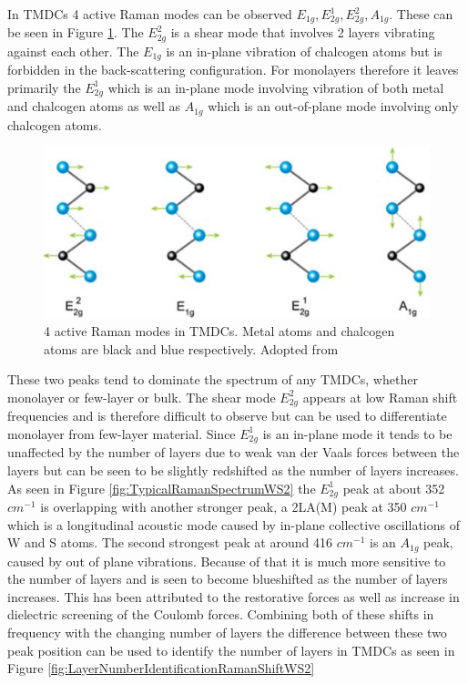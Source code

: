 	In TMDCs 4 active Raman modes can be observed $E_{1g}, E^1_{2g}, E^2_{2g}, A_{1g}$. These can be seen in Figure \ref{fig:4ActiveRamanModes}. The $E^2_{2g}$ is a shear mode that involves 2 layers vibrating against each other. The $E_{1g}$ is an in-plane vibration of chalcogen atoms but is forbidden in the back-scattering configuration. For monolayers therefore it leaves primarily the $E^1_{2g}$ which is an in-plane mode involving vibration of both metal and chalcogen atoms as well as $A_{1g}$ which is an out-of-plane mode involving only chalcogen atoms. 
	
\begin{figure}[h]
	\begin{center}
		\includegraphics[scale=0.4]{RamanActiveModes.png}
		\caption{4 active Raman modes in TMDCs. Metal atoms and chalcogen atoms are black and blue respectively. Adopted from \cite{LatticeDynamicsInMono-AndFew-LayerSheetsOfWS2AndWSe2}}
		\label{fig:4ActiveRamanModes}
	\end{center}
\end{figure}
	
	These two peaks tend to dominate the spectrum of any TMDCs, whether monolayer or few-layer or bulk. The shear mode $E^2_{2g}$ appears at low Raman shift frequencies and is therefore difficult to observe but can be used to differentiate monolayer from few-layer material. Since $E^1_{2g}$ is an in-plane mode it tends to be unaffected by the number of layers due to weak van der Vaals forces between the layers but can be seen to be slightly redshifted as the number of layers increases. As seen in Figure \ref{fig:TypicalRamanSpectrumWS2} the $E^1_{2g}$ peak at about 352 $cm^{-1}$ is overlapping with another stronger peak, a 2LA(M) peak at 350 $cm^{-1}$ which is a longitudinal acoustic mode caused by in-plane collective oscillations of W and S atoms. The second strongest peak at around 416 $cm^{-1}$ is an $A_{1g}$ peak, caused by out of plane vibrations. Because of that it is much more sensitive to the number of layers and is seen to become blueshifted as the number of layers increases. This has been attributed to the restorative forces as well as increase in dielectric screening of the Coulomb forces. Combining both of these shifts in frequency with the changing number of layers the difference between these two peak position can be used to identify the number of layers in TMDCs as seen in Figure \ref{fig:LayerNumberIdentificationRamanShiftWS2}
	

